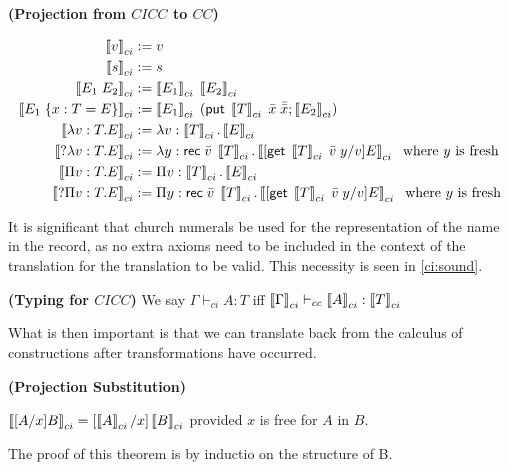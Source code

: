 \begin{definition}
\textbf{ (Projection from $CICC$ to $CC$) }

\begin{align}
\left\llbracket v \right\rrbracket_{ci} &:= v
\\
\left\llbracket s \right\rrbracket_{ci} &:= s
\\
\left\llbracket E_1 \; E_2 \right\rrbracket_{ci} &:= \left\llbracket E_1 \right\rrbracket_{ci} \; \left\llbracket E_2 \right\rrbracket_{ci}
\\
\left\llbracket E_1 \; \{ x : T = E \} \right\rrbracket_{ci} &:= \left\llbracket E_1 \right\rrbracket_{ci} \; (\mathsf{put}\;\left\llbracket T \right\rrbracket_{ci}\;\bar{x}\; \bar{\bar{x}}; \left\llbracket E_2 \right\rrbracket_{ci} )
\\
\left\llbracket \lambda v : T . E  \right\rrbracket_{ci} &:= \lambda v : \left\llbracket T \right\rrbracket_{ci} . \left\llbracket E \right\rrbracket_{ci}
\\
\left\llbracket ?\lambda v : T . E  \right\rrbracket_{ci} &:= \lambda y : \mathsf{rec}\;\bar{v}\; \left\llbracket T \right\rrbracket_{ci} . \left\llbracket  [ \mathsf{get}\; \left\llbracket T \right\rrbracket_{ci}\; \bar{v}\; y  / v ] E \right\rrbracket_{ci}
\;\text{ where $y$ is fresh}
\\
\left\llbracket \Pi v : T . E  \right\rrbracket_{ci} &:= \Pi v : \left\llbracket T \right\rrbracket_{ci} . \left\llbracket E \right\rrbracket_{ci}
\\
\left\llbracket ?\Pi v : T . E  \right\rrbracket_{ci} &:= \Pi y : \mathsf{rec}\;\bar{v}\;\left\llbracket T \right\rrbracket_{ci} . \left\llbracket  [ \mathsf{get}\;\left\llbracket T \right\rrbracket_{ci}\; \bar{v}\; y  / v ] E \right\rrbracket_{ci}
\;\text{ where $y$ is fresh}
\end{align}

\label{cicc:proj}
\end{definition}

It is significant that church numerals be used for the representation of the name in the record, 
as no extra axioms need to be included in the context of the translation for the translation to be valid.  
This necessity is seen in \ref{ci:sound}.

\begin{definition}
\textbf{(Typing for $CICC$)} We say $\Gamma \vdash_{ci} A : T$ iff $\left\llbracket \Gamma \right\rrbracket_{ci} \vdash_{cc} \left\llbracket A \right\rrbracket_{ci} : \left\llbracket T \right\rrbracket_{ci}$
\label{cicc:typing}
\end{definition}

What is then important is that we can translate back from the calculus of constructions after 
transformations have occurred.

\begin{theorem}
\textbf{(Projection Substitution)}  

$\left\llbracket [A/x] B \right\rrbracket_{ci} = [ \left\llbracket A \right\rrbracket_{ci} / x ] \left\llbracket B \right\rrbracket_{ci}$ provided $x$ is free for $A$ in $B$.

\end{theorem}

The proof of this theorem is by inductio on the structure of B.

